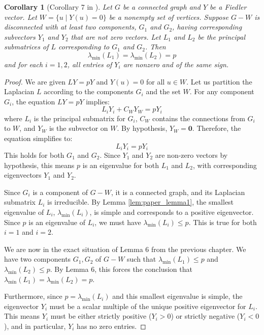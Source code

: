 \documentclass[12pt,a4paper]{report}
\theoremstyle{plain}
\newtheorem{corollary}[theorem]{Corollary}
\theoremstyle{definition}
\theoremstyle{remark}
\begin{document}
\begin{corollary}[Corollary 7 in \cite{main_paper}]
Let $G$ be a connected graph and $Y$ be a Fiedler vector. Let $W = \{u \mid Y(u) = 0\}$ be a nonempty set of vertices. Suppose $G-W$ is disconnected with at least two components, $G_1$ and $G_2$, having corresponding subvectors $Y_1$ and $Y_2$ that are not zero vectors. Let $L_1$ and $L_2$ be the principal submatrices of $L$ corresponding to $G_1$ and $G_2$. Then
$$ \lambda_{\min}(L_1) = \lambda_{\min}(L_2) = p $$
and for each $i=1, 2$, all entries of $Y_i$ are nonzero and of the same sign.
\end{corollary}
\begin{proof}
We are given $LY = pY$ and $Y(u) = 0$ for all $u \in W$.
Let us partition the Laplacian $L$ according to the components $G_i$ and the set $W$.
For any component $G_i$, the equation $LY=pY$ implies:
$$ L_i Y_i + C_W Y_W = p Y_i $$
where $L_i$ is the principal submatrix for $G_i$, $C_W$ contains the connections from $G_i$ to $W$, and $Y_W$ is the subvector on $W$.
By hypothesis, $Y_W = \bm{0}$. Therefore, the equation simplifies to:
$$ L_i Y_i = p Y_i $$
This holds for both $G_1$ and $G_2$. Since $Y_1$ and $Y_2$ are non-zero vectors by hypothesis, this means $p$ is an eigenvalue for both $L_1$ and $L_2$, with corresponding eigenvectors $Y_1$ and $Y_2$.

Since $G_i$ is a component of $G-W$, it is a connected graph, and its Laplacian submatrix $L_i$ is irreducible.
By Lemma \ref{lem:paper_lemma1}, the smallest eigenvalue of $L_i$, $\lambda_{\min}(L_i)$, is simple and corresponds to a positive eigenvector.
Since $p$ is an eigenvalue of $L_i$, we must have $\lambda_{\min}(L_i) \le p$. This is true for both $i=1$ and $i=2$.

We are now in the exact situation of Lemma 6 from the previous chapter. We have two components $G_1, G_2$ of $G-W$ such that $\lambda_{\min}(L_1) \le p$ and $\lambda_{\min}(L_2) \le p$.
By Lemma 6, this forces the conclusion that $\lambda_{\min}(L_1) = \lambda_{\min}(L_2) = p$.

Furthermore, since $p = \lambda_{\min}(L_i)$ and this smallest eigenvalue is simple, the eigenvector $Y_i$ must be a scalar multiple of the unique positive eigenvector for $L_i$.
This means $Y_i$ must be either strictly positive ($Y_i > 0$) or strictly negative ($Y_i < 0$), and in particular, $Y_i$ has no zero entries.
\end{proof}
\end{document}
